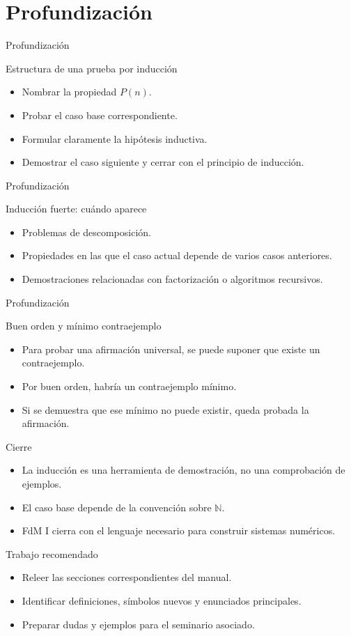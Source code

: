 \documentclass[aspectratio=169,11pt]{beamer}
\begin{document}
\section{Profundización}

\begin{frame}{Profundización}
\begin{block}{Estructura de una prueba por inducción}
\begin{itemize}
  \item Nombrar la propiedad \(P(n)\).
  \item Probar el caso base correspondiente.
  \item Formular claramente la hipótesis inductiva.
  \item Demostrar el caso siguiente y cerrar con el principio de inducción.
\end{itemize}
\end{block}
\end{frame}

\begin{frame}{Profundización}
\begin{block}{Inducción fuerte: cuándo aparece}
\begin{itemize}
  \item Problemas de descomposición.
  \item Propiedades en las que el caso actual depende de varios casos anteriores.
  \item Demostraciones relacionadas con factorización o algoritmos recursivos.
\end{itemize}
\end{block}
\end{frame}

\begin{frame}{Profundización}
\begin{block}{Buen orden y mínimo contraejemplo}
\begin{itemize}
  \item Para probar una afirmación universal, se puede suponer que existe un contraejemplo.
  \item Por buen orden, habría un contraejemplo mínimo.
  \item Si se demuestra que ese mínimo no puede existir, queda probada la afirmación.
\end{itemize}
\end{block}
\end{frame}

\begin{frame}{Cierre}
\begin{itemize}
  \item La inducción es una herramienta de demostración, no una comprobación de ejemplos.
  \item El caso base depende de la convención sobre \(\mathbb{N}\).
  \item FdM I cierra con el lenguaje necesario para construir sistemas numéricos.
\end{itemize}
\end{frame}

\begin{frame}{Trabajo recomendado}
\begin{itemize}
  \item Releer las secciones correspondientes del manual.
  \item Identificar definiciones, símbolos nuevos y enunciados principales.
  \item Preparar dudas y ejemplos para el seminario asociado.
\end{itemize}
\end{frame}
\end{document}
